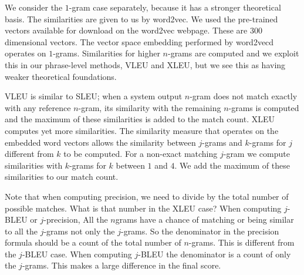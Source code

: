 We consider the $1$-gram case separately, because it has a stronger theoretical basis. 
The similarities are given to us by word2vec. 
We used the pre-trained vectors available for download on the word2vec webpage. 
These are $300$ dimensional vectors. 
The vector space embedding performed by word2vecd operates on $1$-grams. 
Similarities for higher $n$-grams are computed and we exploit this in our phrase-level methods, VLEU and XLEU, but we see this as having weaker theoretical foundations. 

VLEU is similar to SLEU; when a system output $n$-gram does not match exactly with any reference $n$-gram, its similarity with the remaining $n$-grams is computed and the maximum of these similarities is added to the match count. 
XLEU computes yet more similarities. 
The similarity measure that operates on the embedded word vectors allows the similarity between $j$-grams and $k$-grams for $j$ different from $k$ to be computed. 
For a non-exact matching $j$-gram we compute similarities with $k$-grams for $k$ between $1$ and $4$. 
We add the maximum of these similarities to our match count. 


Note that when computing precision, we need to divide by the total number of possible matches. 
What is that number in the XLEU case?
When computing $j$-BLEU or $j$-precision, All the $n$grams have a chance of matching or being similar to all the $j$-grams not only the $j$-grams. 
So the denominator in the precision formula should be a count of the total number of $n$-grams. 
This is different from the $j$-BLEU case. 
When computing $j$-BLEU the denominator is a count of only the $j$-grams. 
This makes a large difference in the final score. 


